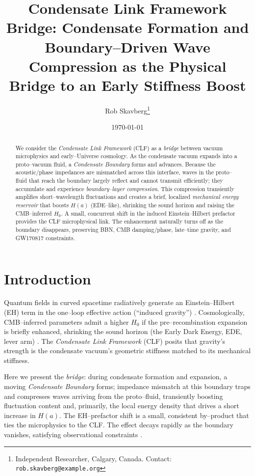 \documentclass[11pt,a4paper]{article}
\title{\textbf{Condensate Link Framework Bridge: Condensate Formation and Boundary--Driven Wave Compression as the Physical Bridge to an Early Stiffness Boost}}
\author{Rob Skavberg\thanks{Independent Researcher, Calgary, Canada. Contact: \texttt{rob.skavberg@example.org}}}
\date{\today}
\begin{document}
\maketitle
\doublespacing

\begin{abstract}
We consider the \emph{Condensate Link Framework} (CLF) as a \emph{bridge} between vacuum microphysics and early--Universe cosmology. As the condensate vacuum expands into a proto--vacuum fluid, a \emph{Condensate Boundary} forms and advances. Because the acoustic/phase impedances are mismatched across this interface, waves in the proto--fluid that reach the boundary largely reflect and cannot transmit efficiently; they accumulate and experience \emph{boundary--layer compression}. This compression transiently amplifies short--wavelength fluctuations and creates a brief, localized \emph{mechanical energy reservoir} that boosts $H(a)$ (EDE--like), shrinking the sound horizon and raising the CMB--inferred $H_0$. A small, concurrent shift in the induced Einstein--Hilbert prefactor provides the CLF microphysical link. The enhancement naturally turns off as the boundary disappears, preserving BBN, CMB damping/phase, late--time gravity, and GW170817 constraints.
\end{abstract}

\section{Introduction}
Quantum fields in curved spacetime radiatively generate an Einstein--Hilbert (EH) term in the one--loop effective action (``induced gravity'') \cite{Sakharov1967,Vassilevich2003,Schwinger1951}. Cosmologically, CMB--inferred parameters admit a higher $H_0$ if the pre--recombination expansion is briefly enhanced, shrinking the sound horizon (the Early Dark Energy, EDE, lever arm) \cite{EDEReview2023,PoulinReview2023,Planck2018}. The \emph{Condensate Link Framework} (CLF) posits that gravity's strength is the condensate vacuum's geometric stiffness matched to its mechanical stiffness.

Here we present the \emph{bridge}: during condensate formation and expansion, a moving \emph{Condensate Boundary} forms; impedance mismatch at this boundary traps and compresses waves arriving from the proto--fluid, transiently boosting fluctuation content and, primarily, the local energy density that drives a short increase in $H(a)$. The EH--prefactor shift is a small, consistent by--product that ties the microphysics to the CLF. The effect decays rapidly as the boundary vanishes, satisfying observational constraints \cite{RiessReview2024,GW170817,Alvey2020}.
\end{document}
